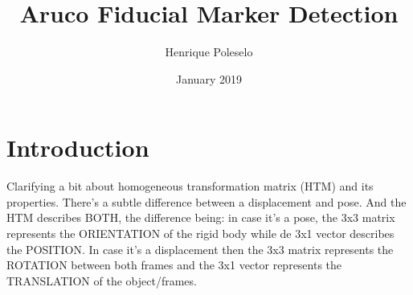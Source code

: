 \documentclass{article}
\title{Aruco Fiducial Marker Detection}
\author{Henrique Poleselo }
\date{January 2019}
\begin{document}
\maketitle

\section{Introduction}
Clarifying a bit about homogeneous transformation matrix (HTM) and its properties. There's a subtle difference between a displacement and pose. And the HTM describes BOTH, the difference being: in case it's a pose, the 3x3 matrix represents the ORIENTATION of the rigid body while de 3x1 vector describes the POSITION. In case it's a displacement then the 3x3 matrix represents the ROTATION between both frames and the 3x1 vector represents the TRANSLATION of the object/frames.
\end{document}
